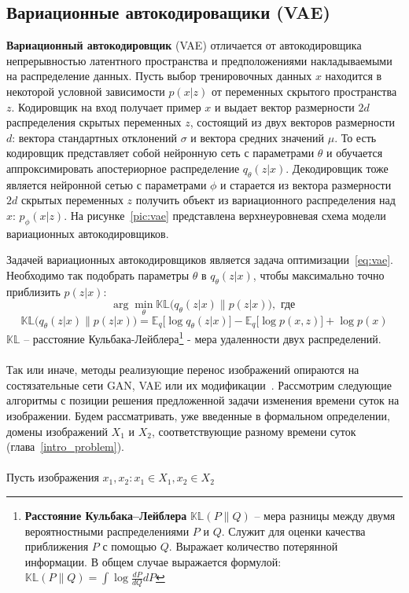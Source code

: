 \documentclass[11pt,a4paper]{extarticle}
\begin{document}
	\subsection{Вариационные автокодироващики (VAE)} \label{sec:vae}		

		\textbf{Вариационный автокодировщик} (VAE) отличается от автокодировщика непрерывностью латентного пространства
		и предположениями накладываемыми на распределение данных.
		Пусть выбор тренировочных данных $x$ находится в некоторой условной зависимости $p(x|z)$ от переменных скрытого пространства $z$.
		Кодировщик на вход получает пример $x$ и выдает вектор размерности $2d$ распределения скрытых переменных $z$, состоящий из двух векторов размерности $d$:
		вектора стандартных отклонений $\sigma$ и вектора средних значений $\mu$. 
		То есть кодировщик представляет собой нейронную сеть с параметрами $\theta$ и обучается аппроксимировать апостериорное распределение $q_{\theta}(z|x)$.
		Декодировщик тоже является нейронной сетью с параметрами $\phi$ и старается из вектора размерности $2d$ скрытых переменных $z$ получить объект из вариационного распределения над $x$: $p_{\phi}(x|z)$.
		На рисунке~\ref{pic:vae} представлена верхнеуровневая схема модели вариационных автокодировщиков.

		Задачей вариационных автокодировщиков является задача оптимизации~\eqref{eq:vae}.
		Необходимо так подобрать параметры $\theta$ в $q_{\theta}(z|x)$, чтобы максимально точно приблизить $p(z|x)$:
		\begin{equation} \label{eq:vae}
			\arg\min_{\theta} \mathbb{KL}\big(q_{\theta}(z|x)\|p(z|x)\big), \text { где }
		\end{equation}
		\begin{equation*}
			\mathbb{KL}\big(q_{\theta}(z|x)\|p(z|x)\big) = \mathbb{E}_q\big[\log q_{\theta}(z|x)\big] - \mathbb{E}_q\big[\log p(x,z)\big] + \log p(x)
		\end{equation*}
		$\mathbb{KL}$ -- расстояние Кульбака-Лейблера\footnote{
			\textbf{Расстояние Кульбака--Лейблера} \(\mathbb{KL}(P\|Q)\) -- мера разницы между двумя вероятностными распределениями \(P\) и \(Q\). Служит для оценки качества приближения \(P\) с помощью \(Q\). Выражает количество потерянной информации.
			В общем случае выражается формулой: \(\mathbb{KL}(P\|Q) = \int\log\frac{dP}{dQ}dP \)
		} - мера удаленности двух распределений.
		\\\\
		Так или иначе, методы реализующие перенос изображений опираются на состязательные сети GAN, VAE или их модификации~\cite{coGAN, BicycleGAN,CycleGAN,DRIT,UNIT,MUNIT,pix2pix}.
		Рассмотрим следующие алгоритмы с позиции решения предложенной задачи изменения времени суток на изображении.
		Будем рассматривать, уже введенные в формальном определении, домены изображений \(X_{1}\) и \(X_{2}\), соответствующие разному времени суток (глава~\ref{intro_problem}).
		\\\\Пусть изображения \(x_{1},x_{2}: x_{1} \in X_{1}, x_{2} \in X_{2}\)
\end{document}
